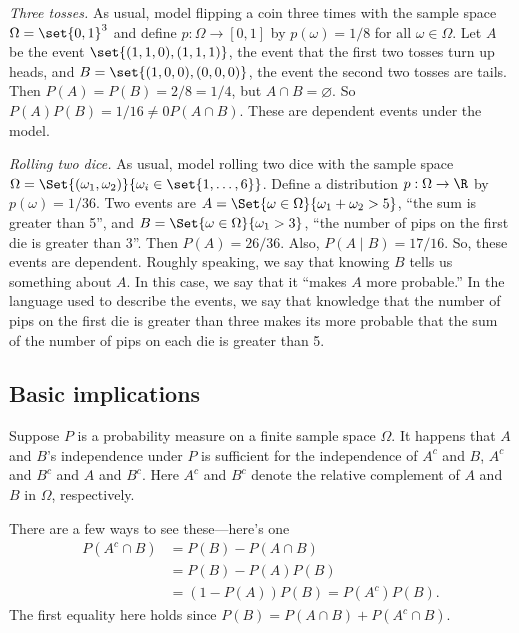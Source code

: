\textit{Three tosses.}
As usual, model flipping a coin three times with the sample space $\Omega  = \set{0,1}^3$ and define $p: \Omega  \to [0,1]$ by $p(\omega ) = 1/8$ for all $\omega  \in \Omega $.
Let $A$ be the event $\set{(1, 1, 0), (1,1,1)}$, the event that the first two tosses turn up heads, and $B = \set{(1, 0, 0), (0, 0, 0)}$, the event the second two tosses are tails.
Then $P(A) = P(B) = 2/8 = 1/4$, but $A \cap  B = \varnothing$.
So $P(A)P(B) = 1/16 \neq 0 P(A \cap  B)$.
These are dependent events under the model.

\textit{Rolling two dice.}
As usual, model rolling two dice with the sample space $\Omega = \Set{(\omega _1, \omega _2)}{ \omega _i \in \set{1, \dots , 6}}$.
Define a distribution $p: \Omega  \to \R $ by $p(\omega ) = 1/36$.
Two events are $A = \Set{\omega  \in \Omega }{ \omega _1 + \omega _2 > 5}$, ``the sum is greater than 5'', and $B = \Set{\omega  \in \Omega }{\omega _1 > 3}$, ``the number of pips on the first die is greater than 3''.
Then $P(A) = 26/36$.
Also, $P(A \mid  B) = 17/16$.
So, these events are dependent.
Roughly speaking, we say that knowing $B$ tells us something about $A$.
In this case, we say that it ``makes $A$ more probable.''
In the language used to describe the events, we say that knowledge that the number of pips on the first die is greater than three makes its more probable that the sum of the number of pips on each die is greater than 5.

\subsection*{Basic implications}

Suppose $P$ is a probability measure on a finite sample space $\Omega $.
It happens that $A$ and $B$'s independence under $P$ is sufficient for the independence of $A^c$ and $B$, $A^c$ and $B^c$ and $A$ and $B^c$.
Here $A^c$ and $B^c$ denote the relative complement of $A$ and $B$ in $\Omega $, respectively.

There are a few ways to see these---here's one
\[
\begin{aligned}
P(A^c \cap  B)
&= P(B) - P(A \cap  B)\\
&= P(B) - P(A)P(B)\\
&= (1- P(A))P(B) = P(A^c)P(B).
\end{aligned}
\]
The first equality here holds since $P(B) = P(A \cap  B) + P(A^c \cap  B)$.


